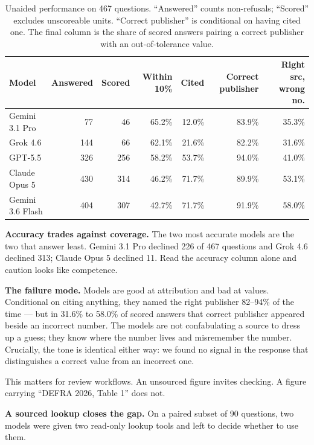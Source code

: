 \documentclass[10pt,a4paper]{article}
\begin{document}
\begin{table}[h]
\centering
\small
\setlength{\tabcolsep}{4.5pt}
\begin{tabular}{lrrrrrr}
\toprule
Model & Answered & Scored & Within 10\% & Cited & Correct publisher & \textbf{Right src, wrong no.} \\
\midrule
Gemini 3.1 Pro    &  77 &  46 & 65.2\% & 12.0\% & 83.9\% & 35.3\% \\
Grok 4.6          & 144 &  66 & 62.1\% & 21.6\% & 82.2\% & 31.6\% \\
GPT-5.5           & 326 & 256 & 58.2\% & 53.7\% & 94.0\% & 41.0\% \\
Claude Opus 5     & 430 & 314 & 46.2\% & 71.7\% & 89.9\% & 53.1\% \\
Gemini 3.6 Flash  & 404 & 307 & 42.7\% & 71.7\% & 91.9\% & 58.0\% \\
\bottomrule
\end{tabular}
\vspace{-0.3em}
\caption{\small Unaided performance on 467 questions. ``Answered'' counts non-refusals; ``Scored'' excludes unscoreable units. ``Correct publisher'' is conditional on having cited one. The final column is the share of scored answers pairing a correct publisher with an out-of-tolerance value.}
\end{table}
\vspace{-1.2em}

\textbf{Accuracy trades against coverage.} The two most accurate models are the two that answer least. Gemini 3.1 Pro declined 226 of 467 questions and Grok 4.6 declined 313; Claude Opus 5 declined 11. Read the accuracy column alone and caution looks like competence.

\textbf{The failure mode.} Models are good at attribution and bad at values. Conditional on citing anything, they named the right publisher 82--94\% of the time --- but in 31.6\% to 58.0\% of scored answers that correct publisher appeared beside an incorrect number. The models are not confabulating a source to dress up a guess; they know where the number lives and misremember the number. Crucially, the tone is identical either way: we found no signal in the response that distinguishes a correct value from an incorrect one.

This matters for review workflows. An unsourced figure invites checking. A figure carrying ``DEFRA 2026, Table 1'' does not.

\textbf{A sourced lookup closes the gap.} On a paired subset of 90 questions, two models were given two read-only lookup tools and left to decide whether to use them.
\end{document}
